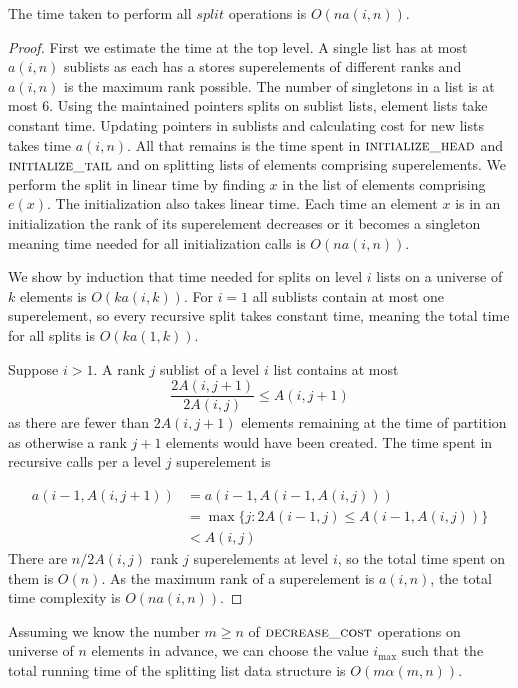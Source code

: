 \begin{theorem}
    The time taken to perform all $split$ operations is $O(na(i,n))$.
\end{theorem}

\begin{proof}
    First we estimate the time at the top level. A single list has at most $a(i,n)$ sublists as each has a stores superelements of different ranks and $a(i,n)$ is the maximum rank possible. The number of singletons in a list is at most $6$. Using the maintained pointers splits on sublist lists, element lists take constant time. Updating pointers in sublists and calculating cost for new lists takes time $a(i,n)$. All that remains is the time spent in $\textsc{initialize\_head}$ and $\textsc{initialize\_tail}$ and on splitting lists of elements comprising superelements. We perform the split in linear time by finding $x$ in the list of elements comprising $e(x)$. The initialization also takes linear time. Each time an element $x$ is in an initialization the rank of its superelement decreases or it becomes a singleton meaning time needed for all initialization calls is $O(na(i,n))$.

    We show by induction that time needed for splits on level $i$ lists on a universe of $k$ elements is $O(ka(i,k))$. For $i=1$ all sublists contain at most one superelement, so every recursive split takes constant time, meaning the total time for all splits is $O(ka(1,k))$.

    Suppose $i > 1$. A rank $j$ sublist of a level $i$ list contains at most 
    \[\frac{2A(i,j+1)}{2A(i,j)} \leq A(i,j+1)\]
    as there are fewer than $2A(i,j+1)$ elements remaining at the time of partition as otherwise a rank $j+1$ elements would have been created. The time spent in recursive calls per a level $j$ superelement is

    \begin{align*}
        a(i-1,A(i,j+1)) &= a(i-1, A(i-1,A(i,j))) \\
        &= \max \{ j: 2A(i-1,j) \leq A(i-1,A(i,j)) \} \\
        &< A(i,j) 
    \end{align*}
    There are $n / 2A(i,j)$ rank $j$ superelements at level $i$, so the total time spent on them is $O(n)$. As the maximum rank of a superelement is $a(i,n)$, the total time complexity is $O(na(i,n))$.

\end{proof}

\begin{theorem}\label{thm:sfm_time}
    Assuming we know the number $m \geq n$ of $\textsc{decrease\_cost}$ operations on universe of $n$ elements in advance, we can choose the value $i_{\max}$ such that the total running time of the splitting list data structure is $O(m\alpha(m,n))$.
\end{theorem}

